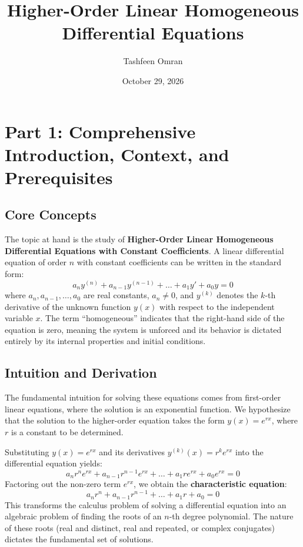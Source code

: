 \documentclass[11pt, a4paper]{article}
\title{Higher-Order Linear Homogeneous Differential Equations}
\author{Tashfeen Omran}
\date{October 29, 2026}
\theoremstyle{definition}
\theoremstyle{remark}
\begin{document}
\maketitle
\tableofcontents
\newpage

\section{Part 1: Comprehensive Introduction, Context, and Prerequisites}

\subsection{Core Concepts}
The topic at hand is the study of \textbf{Higher-Order Linear Homogeneous Differential Equations with Constant Coefficients}. A linear differential equation of order $n$ with constant coefficients can be written in the standard form:
\[ a_n y^{(n)} + a_{n-1} y^{(n-1)} + \dots + a_1 y' + a_0 y = 0 \]
where $a_n, a_{n-1}, \dots, a_0$ are real constants, $a_n \neq 0$, and $y^{(k)}$ denotes the $k$-th derivative of the unknown function $y(x)$ with respect to the independent variable $x$. The term ``homogeneous'' indicates that the right-hand side of the equation is zero, meaning the system is unforced and its behavior is dictated entirely by its internal properties and initial conditions.

\subsection{Intuition and Derivation}
The fundamental intuition for solving these equations comes from first-order linear equations, where the solution is an exponential function. We hypothesize that the solution to the higher-order equation takes the form $y(x) = e^{rx}$, where $r$ is a constant to be determined. 

Substituting $y(x) = e^{rx}$ and its derivatives $y^{(k)}(x) = r^k e^{rx}$ into the differential equation yields:
\[ a_n r^n e^{rx} + a_{n-1} r^{n-1} e^{rx} + \dots + a_1 r e^{rx} + a_0 e^{rx} = 0 \]
Factoring out the non-zero term $e^{rx}$, we obtain the \textbf{characteristic equation}:
\[ a_n r^n + a_{n-1} r^{n-1} + \dots + a_1 r + a_0 = 0 \]
This transforms the calculus problem of solving a differential equation into an algebraic problem of finding the roots of an $n$-th degree polynomial. The nature of these roots (real and distinct, real and repeated, or complex conjugates) dictates the fundamental set of solutions.
\end{document}
